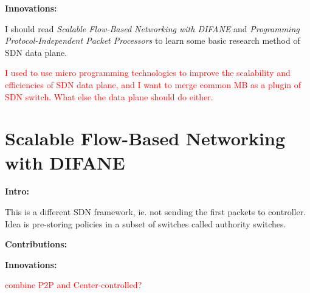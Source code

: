 \noindent
\textbf{Innovations:}

I should read \emph{Scalable Flow-Based Networking with DIFANE} and \emph{Programming Protocol-Independent Packet Processors} to learn some basic research method of SDN data plane.

\textcolor{red}{I used to use micro programming technologies to improve the scalability and efficiencies of SDN data plane, and I want to merge common MB as a plugin of SDN switch. What else the data plane should do either.}

\section{Scalable Flow-Based Networking with DIFANE}

\textbf{Intro:}

This is a different SDN framework, ie. not sending the first packets to controller. Idea is pre-storing policies in a subset of switches called authority switches.

\noindent
\textbf{Contributions:}

\noindent
\textbf{Innovations:}

\textcolor{red}{combine P2P and Center-controlled?} 


